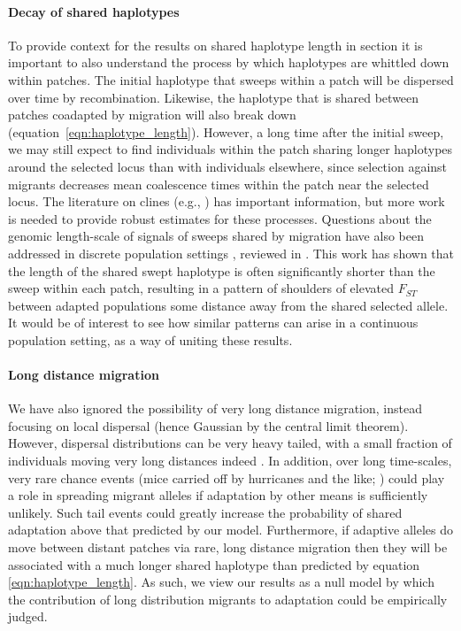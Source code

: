 \documentclass{article}
\newcommand{\linelabel}[1]{}
\newcommand{\citep}[1]{\cite{#1}}
\newcommand{\citet}[1]{\cite{#1}}
\newcommand{\secref}[1]{{\emph{\nameref{#1}}}}
\begin{document}
\paragraph{Decay of shared haplotypes} \linelabel{rr:haplotype_discussion}
To provide context for the results on shared haplotype length in
section \secref{ss:haplotype_length}
it is important to also understand
the process by which haplotypes are whittled down within patches.
The initial haplotype that sweeps within a patch 
will be dispersed over time by recombination.
Likewise, the haplotype that is shared between patches coadapted by migration
will also break down
(equation~\ref{eqn:haplotype_length}).
However, a long time after the initial sweep,
we may still expect to find individuals within the patch sharing longer haplotypes around the selected locus
than with individuals elsewhere,
since selection against migrants 
decreases mean coalescence times within the patch near the selected locus.  %
The literature on clines (e.g., \citet{barton1979geneflow}) has important information,
but more work is needed
to provide robust estimates for these processes.
Questions about the genomic length-scale of signals of
sweeps shared by migration have also been addressed in discrete
population settings \citep{slatkin1998hitchhiking,kim2011hitchhiking}, reviewed in \citet{barton2000genetic}. 
This work has shown that the length of the shared swept haplotype is often significantly
shorter than the sweep within each patch, resulting in a pattern of
shoulders of elevated $F_{ST}$ between adapted populations some distance away from
the shared selected allele. It would be of interest to see how similar
patterns can arise in a continuous population setting, as a way of
uniting these results.

\paragraph{Long distance migration}
We have also ignored the possibility of very long distance migration,
instead focusing on local dispersal (hence Gaussian by the central limit theorem).
However, dispersal distributions can be very heavy tailed, 
with a small fraction of individuals moving very long distances indeed \citep{levin2003ecology,reynolds2009levy}.
In addition, over long time-scales, very rare chance events (mice carried off by hurricanes and the like; \citet{censky1998overwater,nathan2008mechanisms})
could play a role in spreading migrant alleles if adaptation by other means is sufficiently unlikely.
Such tail events could greatly increase the probability of shared adaptation above that predicted by our model. 
Furthermore, if adaptive alleles do move between distant patches via rare, long distance migration 
then they will be associated with a much longer shared haplotype than predicted by equation \eqref{eqn:haplotype_length}. 
As such, we view our results as a null model by which the contribution of long distribution migrants to adaptation could be empirically judged.   
\end{document}
